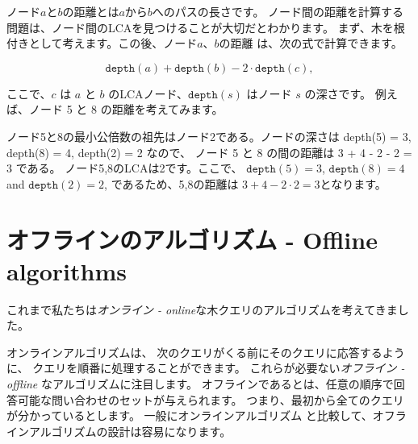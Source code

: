 ノード$a$と$b$の距離とは$a$から$b$へのパスの長さです。
ノード間の距離を計算する問題は、ノード間のLCAを見つけることが大切だとわかります。
まず、木を根付きとして考えます。この後、ノード$a$、$b$の距離 は、次の式で計算できます。

\[\texttt{depth}(a)+\texttt{depth}(b)-2 \cdot \texttt{depth}(c),\]

ここで、$c$ は $a$ と $b$ のLCAノード、$\texttt{depth}(s)$ はノード $s$ の深さです。
例えば、ノード 5 と 8 の距離を考えてみます。

\begin{center}
\end{center}

ノード5と8の最小公倍数の祖先はノード2である。ノードの深さは depth(5) = 3, depth(8) = 4, depth(2) = 2 なので、 ノード 5 と 8 の間の距離は 3 + 4 - 2 - 2 = 3 である。
ノード5,8のLCAは2です。ここで、
$\texttt{depth}(5)=3$, $\texttt{depth}(8)=4$ and $\texttt{depth}(2)=2$,
であるため、5,8の距離は
$3+4-2\cdot2=3$となります。

\section{オフラインのアルゴリズム - Offline algorithms}

これまで私たちは\emph{オンライン - online}な木クエリのアルゴリズムを考えてきました。

オンラインアルゴリズムは、
次のクエリがくる前にそのクエリに応答するように、
クエリを順番に処理することができます。
これらが必要ない\emph{オフライン - offline} なアルゴリズムに注目します。
オフラインであるとは、任意の順序で回答可能な問い合わせのセットが与えられます。
つまり、最初から全てのクエリが分かっているとします。
一般にオンラインアルゴリズム と比較して、オフラインアルゴリズムの設計は容易になります。

